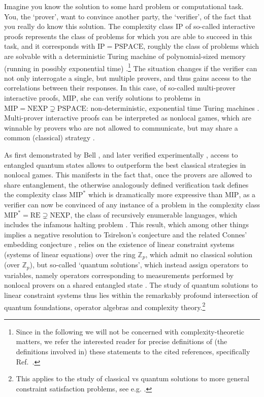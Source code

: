 \documentclass[aps,pra,letterpaper,onrcolumn,nofootinbib,notitlepage,longbibliography]{revtex4-1}
\newcommand{\zz}{\mathbb Z}
\begin{document}
Imagine you know the solution to some hard problem or computational task. You, the `prover', want to convince another party, the `verifier', of the fact that you really do know this solution. The complexity class $\mathrm{IP}$ of so-called interactive proofs represents the class of problems for which you are able to succeed in this task, and it corresponds with $\mathrm{IP=PSPACE}$, roughly the class of problems which are solvable with a deterministic Turing machine of polynomial-sized memory (running in possibly exponential time) \cite{Shamir1990}.\footnote{Since in the following we will not be concerned with complexity-theoretic matters, we refer the interested reader for precise definitions of (the definitions involved in) these statements to the cited references, specifically Ref.~\cite{JiEtAl2020}.} The situation changes if the verifier can not only interrogate a single, but multiple provers, and thus gains access to the correlations between their responses. In this case, of so-called multi-prover interactive proofs, $\mathrm{MIP}$, she can verify solutions to problems in $\mathrm{MIP=NEXP}\supsetneq\mathrm{PSPACE}$: non-deterministic, exponential time Turing machines \cite{BabaiEtAl1991}. Multi-prover interactive proofs can be interpreted as nonlocal games, which are winnable by provers who are not allowed to communicate, but may share a common (classical) strategy \cite{Mermin1990,Peres1991,CleveEtAl2004,Arkhipov2012,CleveMittal2014}.

As first demonstrated by Bell \cite{Bell1964,Bell1975}, and later verified experimentally \cite{FreedmanClauser1972,AspectEtAl1981,ZeilingerEtAl2015,ShalmEtAl2015}, access to entangled quantum states allows to outperform the best classical strategies in nonlocal games. This manifests in the fact that, once the provers are allowed to share entanglement, the otherwise analogously defined verification task defines the complexity class $\mathrm{MIP}^*$ which is dramatically more expressive than $\mathrm{MIP}$, as a verifier can now be convinced of any instance of a problem in the complexity class $\mathrm{MIP^*=RE}\supsetneq\mathrm{NEXP}$, the class of recursively enumerable languages, which includes the infamous halting problem \cite{JiEtAl2020}. This result, which among other things implies a negative resolution to Tsirelson's conjecture \cite{Tsirelson1980,Tsirelson2006} and the related Connes' embedding conjecture \cite{JungeEtAl2011,Fritz2012}, relies on the existence of linear constraint systems (systems of linear equations) over the ring $\zz_p$, which admit no classical solution (over $\zz_p$), but so-called `quantum solutions', which instead assign operators to variables, namely operators corresponding to measurements performed by nonlocal provers on a shared entangled state \cite{CleveMittal2014,CleveLiuSlofstra2017}. The study of quantum solutions to linear constraint systems thus lies within the remarkably profound intersection of quantum foundations, operator algebras and complexity theory.\footnote{This applies to the study of classical vs quantum solutions to more general constraint satisfaction problems, see e.g. \cite{AtseriasKolaitisSeverini2019,BulatovStanislav2025}.}
\end{document}
